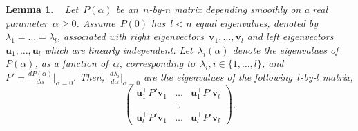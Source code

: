 \documentclass[letterpaper, 10pt, conference]{ieeeconf}
\newtheorem{lem}{Lemma}
\def\mb{\mathbf}
\begin{document}
\begin{lem} \label{lem_dM} {\hspace{-0.005cm}~\cite{seyranian2003multiparameter,cai2012average}}
Let~$P(\alpha)$ be an~$n$-by-$n$ matrix depending smoothly on a real parameter~$\alpha \geq 0$. Assume~$P(0)$ has~$l<n$ equal eigenvalues, denoted by~$\lambda_1=\ldots=\lambda_l$, associated with right eigenvectors~$\mb{v}_1,\ldots,\mb{v}_l$ and left eigenvectors~$\mb{u}_1,\ldots,\mb{u}_l$ which are linearly independent. 
Let~$\lambda_i(\alpha)$ denote the eigenvalues of~$P(\alpha)$, as a function of~$\alpha$, corresponding to~${\lambda_i, i \in \{1,\ldots,l\}}$, and~$P' = \frac{dP(\alpha)}{d\alpha}|_{\alpha=0}$. Then,~$\frac{d\lambda_i}{d\alpha}|_{\alpha=0}$ are the eigenvalues of the following~$l$-by-$l$ matrix,
\[\left(\begin{array}{ccc}
\mb{u}_1^\top P' \mb{v}_1 & \ldots & \mb{u}_1^\top P' \mb{v}_l \\
 & \ddots & \\
\mb{u}_l^\top P' \mb{v}_1 & \ldots & \mb{u}_l^\top P' \mb{v}_l 
\end{array} \right).
\]  
\end{lem}
\end{document}
